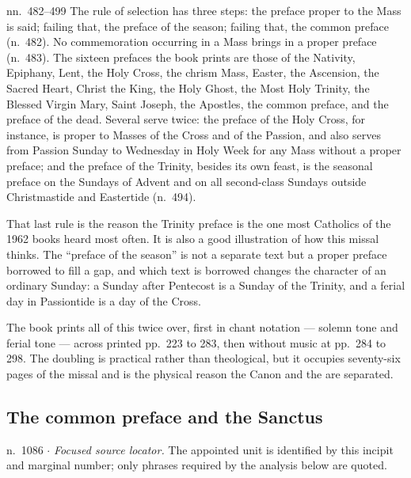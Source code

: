 \begin{rubricnote}{ nn.~482--499}
The rule of selection has three steps: the preface proper to the Mass is said;
failing that, the preface of the season; failing that, the common preface
(n.~482). No commemoration occurring in a Mass brings in a proper preface
(n.~483). The sixteen prefaces the book prints are those of the Nativity,
Epiphany, Lent, the Holy Cross, the chrism Mass, Easter, the Ascension, the
Sacred Heart, Christ the King, the Holy Ghost, the Most Holy Trinity, the
Blessed Virgin Mary, Saint Joseph, the Apostles, the common preface, and the
preface of the dead. Several serve twice: the preface of the Holy Cross, for
instance, is proper to Masses of the Cross and of the Passion, and also serves
 from Passion Sunday to Wednesday in Holy Week for any
Mass without a proper preface; and the preface of the Trinity, besides its own
feast, is the seasonal preface on the Sundays of Advent and on all second-class
Sundays outside Christmastide and Eastertide (n.~494).
\end{rubricnote}

That last rule is the reason the Trinity preface is the one most Catholics of
the 1962 books heard most often. It is also a good illustration of how this
missal thinks. The ``preface of the season'' is not a separate text but a
proper preface borrowed to fill a gap, and which text is borrowed changes the
character of an ordinary Sunday: a Sunday after Pentecost is a Sunday of the
Trinity, and a ferial day in Passiontide is a day of the Cross.

The book prints all of this twice over, first in chant notation --- solemn tone
and ferial tone --- across printed pp.~223 to 283, then without music at
pp.~284 to 298. The doubling is practical rather than theological, but it
occupies seventy-six pages of the missal and is the physical reason the Canon
and the  are separated.

\subsection*{The common preface and the Sanctus}

\begin{appointed}{n.~1086 $\cdot$ }
\textit{Focused source locator.} The appointed unit is identified by this incipit and marginal number; only phrases required by the analysis below are quoted.
\end{appointed}

